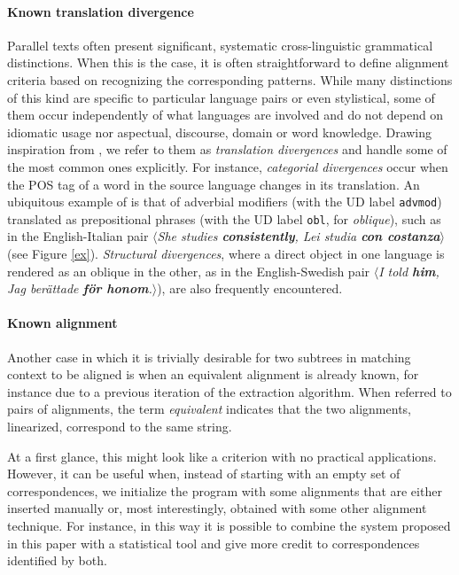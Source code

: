 \documentclass[11pt]{article}
\begin{document}
\paragraph{Known translation divergence}
Parallel texts often present significant, systematic cross-linguistic grammatical distinctions. 
When this is the case, it is often straightforward to define alignment criteria based on recognizing the corresponding patterns.
While many distinctions of this kind are specific to particular language pairs or even stylistical, some of them occur independently of what languages are involved and do not depend on idiomatic usage nor aspectual, discourse, domain or word knowledge.   
Drawing inspiration from \cite{dorr-1994-machine}, we refer to them as \textit{translation divergences} and handle some of the most common ones explicitly. 
For instance, \textit{categorial divergences} occur when the POS tag of a word in the source language changes in its translation.
An ubiquitous example of is that of adverbial modifiers (with the UD label \texttt{advmod}) translated as prepositional phrases (with the UD label \texttt{obl}, for \textit{oblique}), such as in the English-Italian pair $\langle$\textit{She studies \textbf{consistently}, Lei studia \textbf{con costanza}}$\rangle$ (see Figure \ref{ex}).
\textit{Structural divergences}, where a direct object in one language is rendered as an oblique in the other, as in the English-Swedish pair $\langle$\textit{I told \textbf{him}, Jag berättade \textbf{för honom}.}$\rangle$), are also frequently encountered.

\paragraph{Known alignment} \label{ka}
Another case in which it is trivially desirable for two subtrees in matching context to be aligned is when an equivalent alignment is already known, for instance due to a previous iteration of the extraction algorithm. 
When referred to pairs of alignments, the term \textit{equivalent} indicates that the two alignments, linearized, correspond to the same string.

At a first glance, this might look like a criterion with no practical applications. 
However, it can be useful when, instead of starting with an empty set of correspondences, we initialize the program with some alignments that are either inserted manually or, most interestingly, obtained with some other alignment technique. 
For instance, in this way it is possible to combine the system proposed in this paper with a statistical tool and give more credit to correspondences identified by both.
\end{document}

